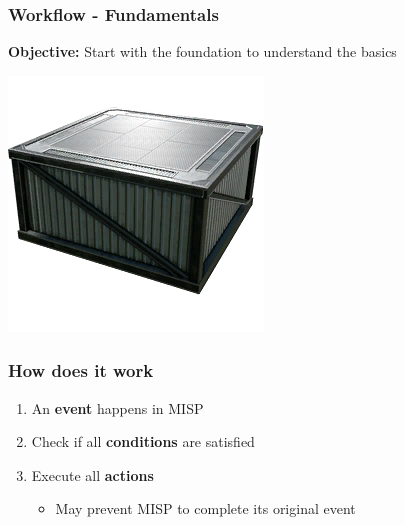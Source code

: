 \begin{frame}
    \frametitle{
        \huge
        \linebreak
        \linebreak
        \linebreak
        Workflow - Fundamentals
        \vspace{1em}
    }
    \textbf{Objective:} Start with the foundation to understand the basics
    \begin{center}
        \includegraphics[width=0.07\linewidth]{pictures/fundation}
    \end{center}
\end{frame}


\begin{frame}
    \frametitle{How does it work}
    \begin{center}
    \end{center}
    \begin{enumerate}
        \item An \textbf{event} happens in MISP
        \item Check if all \textbf{conditions} are satisfied
        \item Execute all \textbf{actions}
        \begin{itemize}
            \item May prevent MISP to complete its original event
        \end{itemize}
    \end{enumerate}
\end{frame}

